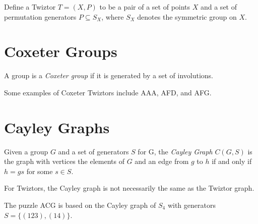 \documentclass{article}
\begin{document}
Define a Twiztor $T = (X, P)$ to be a pair of a set of points $X$ and a set of permutation generators $P\subseteq S_X$, where $S_X$ denotes the symmetric group on $X$.

\section{Coxeter Groups}

A group is a \emph{Coxeter group} if it is generated by a set of involutions.

Some examples of Coxeter Twiztors include AAA, AFD, and AFG.

\section{Cayley Graphs}

Given a group $G$ and a set of generators $S$ for G, the \emph{Cayley Graph} $C(G, S)$ is the graph with vertices the elements of $G$ and an edge from $g$ to $h$ if and only if $h = gs$ for some $s\in S$.

For Twiztors, the Cayley graph is not necessarily the same as the Twiztor graph.

The puzzle ACG is based on the Cayley graph of $S_4$ with generators $S = \{(1 2 3), (1 4)\}$.
\end{document}
